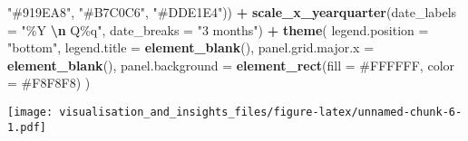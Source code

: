 \documentclass[
]{article}
\newenvironment{Shaded}{\begin{snugshade}}{\end{snugshade}}
\newcommand{\AttributeTok}[1]{\textcolor[rgb]{0.13,0.29,0.53}{#1}}
\newcommand{\FunctionTok}[1]{\textcolor[rgb]{0.13,0.29,0.53}{\textbf{#1}}}
\newcommand{\NormalTok}[1]{#1}
\newcommand{\SpecialCharTok}[1]{\textcolor[rgb]{0.81,0.36,0.00}{\textbf{#1}}}
\newcommand{\StringTok}[1]{\textcolor[rgb]{0.31,0.60,0.02}{#1}}
\begin{document}
\begin{Shaded}
\begin{Highlighting}[]
                                 \StringTok{"\#919EA8"}\NormalTok{, }\StringTok{"\#B7C0C6"}\NormalTok{, }
                                 \StringTok{"\#DDE1E4"}\NormalTok{)) }\SpecialCharTok{+}
    \FunctionTok{scale\_x\_yearquarter}\NormalTok{(}\AttributeTok{date\_labels =} \StringTok{"\%Y }\SpecialCharTok{\textbackslash{}n}\StringTok{ Q\%q"}\NormalTok{, }\AttributeTok{date\_breaks =} \StringTok{"3 months"}\NormalTok{) }\SpecialCharTok{+}
    \FunctionTok{theme}\NormalTok{(}
      \AttributeTok{legend.position =} \StringTok{"bottom"}\NormalTok{,}
      \AttributeTok{legend.title =} \FunctionTok{element\_blank}\NormalTok{(),}
      \AttributeTok{panel.grid.major.x =} \FunctionTok{element\_blank}\NormalTok{(),}
      \AttributeTok{panel.background =} \FunctionTok{element\_rect}\NormalTok{(}\AttributeTok{fill =} \StringTok{\textquotesingle{}\#FFFFFF\textquotesingle{}}\NormalTok{, }\AttributeTok{color =} \StringTok{\textquotesingle{}\#F8F8F8\textquotesingle{}}\NormalTok{)}
\NormalTok{    )}
\end{Highlighting}
\end{Shaded}

\texttt{[image: visualisation\_and\_insights\_files/figure-latex/unnamed-chunk-6-1.pdf]}
\end{document}
